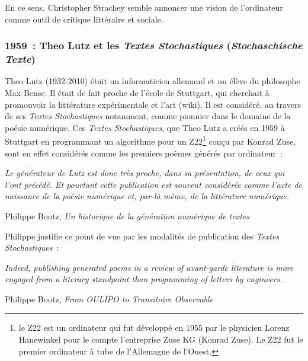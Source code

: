 \documentclass{article}
\newenvironment{citationbox}
{\begin{center}
		\begin{minipage}{.8\textwidth}
		}
		{
		\end{minipage}	
\end{center}
}
\begin{document}
				En ce sens, Christopher Strachey semble annoncer une vision de l'ordinateur comme outil de critique littéraire et sociale.
		
			\subsubsection{1959 : Theo Lutz et les \textit{Textes Stochastiques} (\textit{Stochaschische Texte})}
				Theo Lutz (1932-2010) était un informaticien allemand et un élève du philosophe Max Bense. Il était de fait proche de l'école de Stuttgart, qui cherchait à promouvoir la littérature expérimentale et l'art (wiki).  Il  est considéré, au travers de ses \textit{Textes Stochastiques} notamment, comme pionnier dans le domaine de la poésie numérique. Ces \textit{Textes Stochastiques}, que Theo Lutz a créés en 1959 à Stuttgart en programmant un algorithme pour un Z22\footnote{le Z22 est un ordinateur qui fut développé en 1955 par le physicien Lorenz Hanewinkel pour le compte l'entreprise Zuse KG (Konrad Zuse). Le Z22 fut le premier ordinateur à tube de l'Allemagne de l'Ouest.} conçu par Konrad Zuse, sont en effet considérés comme les premiers poèmes générés par ordinateur :
				\begin{citationbox}
					\textit{Le générateur de Lutz est donc très proche, dans sa présentation, de ceux qui l'ont précédé. Et pourtant cette publication est souvent considérée comme l'acte de naissance de la poésie numérique et, par-là même, de la littérature numérique.}
					\begin{flushright}
						Philippe Bootz, \textit{Un historique de la génération numérique de textes}\cite{bootz}
					\end{flushright}
				\end{citationbox}
				Philippe justifie ce point de vue par les modalités de publication des \textit{Textes Stochastiques}~:
				
				\begin{citationbox}
					\textit{Indeed, publishing generated poems in a review of avant-garde literature is more engaged from a literary standpoint than programming of letters by engineers.}
					\begin{flushright}
						Philippe Bootz, \textit{From OULIPO to Transitoire Observable} \cite{bootz2012}
					\end{flushright}
				\end{citationbox}
				
\end{document}
